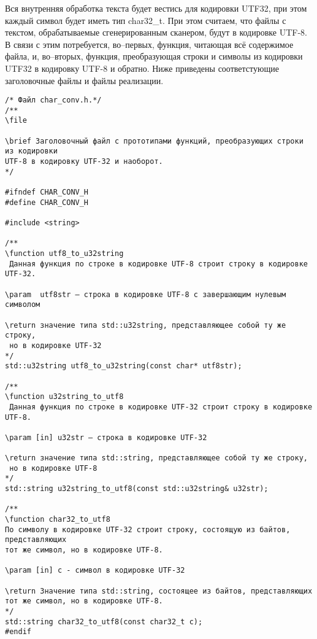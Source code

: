 \documentclass[10pt]{report}
\newcounter{defin}[section]
\begin{document}
Вся внутренняя обработка текста будет вестись для кодировки UTF32, при этом каждый символ будет иметь тип char32_t. При этом считаем, что файлы с текстом, 
обрабатываемые сгенерированным сканером, будут в кодировке UTF-8. В связи с этим потребуется, во--первых, функция, читающая всё содержимое файла, и, во--вторых, функция, преобразующая строки и символы из кодировки UTF32 в кодировку UTF-8 и обратно. Ниже приведены соответстующие заголовочные файлы и файлы реализации.
\begin{verbatim}
/* Файл char_conv.h.*/
/**
\file

\brief Заголовочный файл с прототипами функций, преобразующих строки из кодировки
UTF-8 в кодировку UTF-32 и наоборот.
*/

#ifndef CHAR_CONV_H
#define CHAR_CONV_H

#include <string>

/**
\function utf8_to_u32string
 Данная функция по строке в кодировке UTF-8 строит строку в кодировке UTF-32.

\param  utf8str – строка в кодировке UTF-8 с завершающим нулевым символом

\return значение типа std::u32string, представляющее собой ту же строку,
 но в кодировке UTF-32
*/
std::u32string utf8_to_u32string(const char* utf8str);

/**
\function u32string_to_utf8
 Данная функция по строке в кодировке UTF-32 строит строку в кодировке UTF-8.

\param [in] u32str – строка в кодировке UTF-32

\return значение типа std::string, представляющее собой ту же строку,
 но в кодировке UTF-8
*/
std::string u32string_to_utf8(const std::u32string& u32str);

/**
\function char32_to_utf8
По символу в кодировке UTF-32 строит строку, состоящую из байтов, представляющих
тот же символ, но в кодировке UTF-8.

\param [in] с - символ в кодировке UTF-32

\return Значение типа std::string, состоящее из байтов, представляющих
тот же символ, но в кодировке UTF-8.
*/
std::string char32_to_utf8(const char32_t c);
#endif
\end{verbatim}
\end{document}
